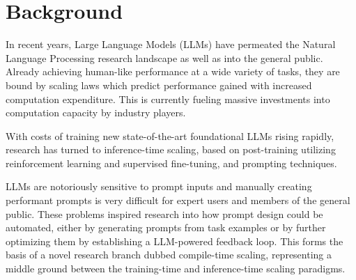 \section{Background}
In recent years, Large Language Models (LLMs) have permeated the Natural Language Processing research landscape as well as into the general public. 
Already achieving human-like performance at a wide variety of tasks\cite{bubeck2023sparksartificialgeneralintelligence}, 
they are bound by scaling laws\cite{kaplan2020scalinglawsneurallanguage} which predict performance gained with increased computation expenditure.
This is currently fueling massive investments into computation capacity by industry players. 

With costs of training new state-of-the-art foundational LLMs rising rapidly, research has turned to inference-time scaling\cite{welleck2024decodingmetagenerationinferencetimealgorithms}, 
based on post-training\cite{openai2024openaio1card}\cite{deepseekai2025deepseekr1incentivizingreasoningcapability} utilizing reinforcement learning and supervised fine-tuning, and 
prompting techniques\cite{schulhoff2024promptreportsystematicsurvey}. 

LLMs are notoriously sensitive to prompt inputs\cite{zhuo2024prosaassessingunderstandingprompt}\cite{salinas2024butterflyeffectalteringprompts} and manually creating
performant prompts is very difficult\cite{10.1145/3544548.3581388} for expert users and members of the general public. These problems inspired research into how
prompt design could be automated, either by generating prompts from task examples\cite{honovich2022instructioninductionexamplesnatural} or by 
further optimizing them by establishing a LLM-powered feedback loop\cite{yang2024largelanguagemodelsoptimizers}\cite{zhou2023largelanguagemodelshumanlevel}\cite{he2024crispomultiaspectcritiquesuggestionguidedautomatic}. This forms the basis of a novel research branch dubbed compile-time scaling\cite{schnabel2024symbolicpromptprogramsearch},
representing a middle ground between the training-time and inference-time scaling paradigms.

